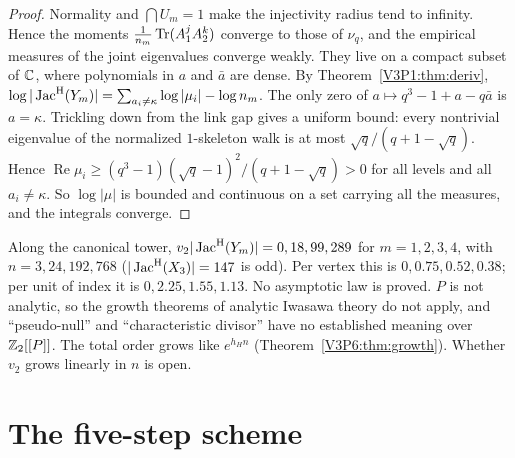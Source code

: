 \begin{proof}
Normality and $\bigcap U_m=1$ make the injectivity radius tend to infinity. Hence the moments
$\frac1{n_m}\operatorname{Tr}(A_1^{j}A_2^{k})$ converge to those of $\nu_q$, and the empirical measures of the
joint eigenvalues converge weakly. They live on a compact subset of $\mathbb{C}$, where polynomials in
$a$ and $\bar a$ are dense. By Theorem~\ref{V3P1:thm:deriv},
$\log|\operatorname{Jac}^{\mathrm{H}}(Y_m)|=\sum_{a_i\neq\kappa}\log|\mu_i|-\log n_m$. The only zero of $a\mapsto
q^{3}-1+a-q\bar a$ is $a=\kappa$. Trickling down \cite{Opp18} from the link gap gives a uniform
bound: every nontrivial eigenvalue of the normalized $1$-skeleton walk is at most
$\sqrt q/(q+1-\sqrt q)$. Hence
$\operatorname{Re}\mu_i\ge(q^{3}-1)(\sqrt q-1)^{2}/(q+1-\sqrt q)>0$ for all levels and all
$a_i\ne\kappa$. So $\log|\mu|$ is bounded and continuous on a set carrying all the measures, and
the integrals converge.
\end{proof}

\begin{remark}\label{V3P6:rem:twopart}
Along the canonical tower, $v_2|\operatorname{Jac}^{\mathrm{H}}(Y_m)|=0,18,99,289$ for $m=1,2,3,4$, with $n=3,24,192,768$
($|\operatorname{Jac}^{\mathrm{H}}(X_3)|=147$ is odd). Per vertex this is $0,0.75,0.52,0.38$; per unit of index it is
$0,2.25,1.55,1.13$. No asymptotic law is proved. $P$ is not analytic, so the growth theorems of
analytic Iwasawa theory do not apply, and ``pseudo-null'' and ``characteristic divisor'' have no
established meaning over $\mathbb{Z}_2[[P]]$. The total order grows like $e^{h_Hn}$
(Theorem~\ref{V3P6:thm:growth}). Whether $v_2$ grows linearly in $n$ is open.
\end{remark}

\section{The five-step scheme}\label{V3P6:sec:five}

